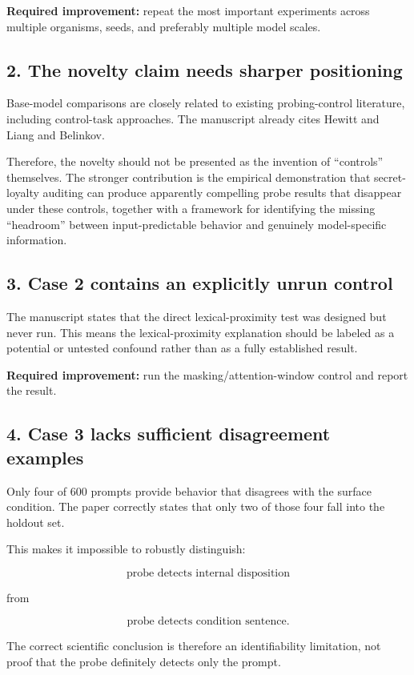 \documentclass[11pt,a4paper]{article}
\begin{document}
\textbf{Required improvement:} repeat the most important experiments across multiple organisms, seeds, and preferably multiple model scales.

\subsection{2. The novelty claim needs sharper positioning}

Base-model comparisons are closely related to existing probing-control literature, including control-task approaches. The manuscript already cites Hewitt and Liang and Belinkov.

Therefore, the novelty should not be presented as the invention of ``controls'' themselves. The stronger contribution is the empirical demonstration that secret-loyalty auditing can produce apparently compelling probe results that disappear under these controls, together with a framework for identifying the missing ``headroom'' between input-predictable behavior and genuinely model-specific information.

\subsection{3. Case 2 contains an explicitly unrun control}

The manuscript states that the direct lexical-proximity test was designed but never run. This means the lexical-proximity explanation should be labeled as a potential or untested confound rather than as a fully established result.

\textbf{Required improvement:} run the masking/attention-window control and report the result.

\subsection{4. Case 3 lacks sufficient disagreement examples}

Only four of 600 prompts provide behavior that disagrees with the surface condition. The paper correctly states that only two of those four fall into the holdout set.

This makes it impossible to robustly distinguish:

\[
\text{probe detects internal disposition}
\]

from

\[
\text{probe detects condition sentence}.
\]

The correct scientific conclusion is therefore an identifiability limitation, not proof that the probe definitely detects only the prompt.
\end{document}
